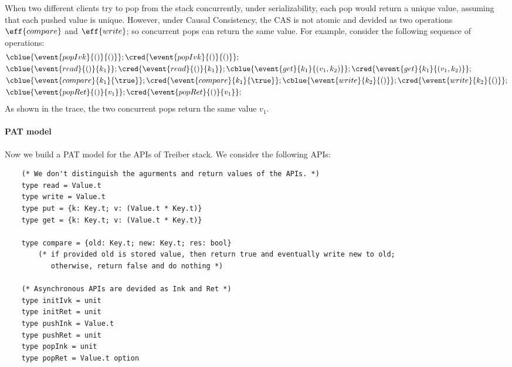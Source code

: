 When two different clients try to pop from the stack concurrently, under serializability, each pop
would return a unique value, assuming that each pushed value is unique. However, under Causal
Consistency, the CAS is not atomic and devided as two operations $\eff{compare}$ and $\eff{write}$; so concurrent pops can return the same value. For example, consider the following sequence of operations:
\begin{align*}
    &\cblue{\event{popIvk}{()}{()}};\cred{\event{popIvk}{()}{()}};\\
    &\cblue{\event{read}{()}{k_1}};\cred{\event{read}{()}{k_1}};\cblue{\event{get}{k_1}{(v_1, k_2)}};\cred{\event{get}{k_1}{(v_1, k_2)}};\\
    &\cblue{\event{compare}{k_1}{\true}};\cred{\event{compare}{k_1}{\true}};\cblue{\event{write}{k_2}{()}};\cred{\event{write}{k_2}{()}};\\
    &\cblue{\event{popRet}{()}{v_1}};\cred{\event{popRet}{()}{v_1}};
\end{align*}\noindent
As shown in the trace, the two concurrent pops return the same value $v_1$.

\paragraph{PAT model} Now we build a PAT model for the APIs of Treiber stack. We consider the following APIs:
\begin{verbatim}
    (* We don't distinguish the agurments and return values of the APIs. *)
    type read = Value.t
    type write = Value.t
    type put = {k: Key.t; v: (Value.t * Key.t)}
    type get = {k: Key.t; v: (Value.t * Key.t)}

    type compare = {old: Key.t; new: Key.t; res: bool} 
        (* if provided old is stored value, then return true and eventually write new to old; 
           otherwise, return false and do nothing *)

    (* Asynchronous APIs are devided as Ink and Ret *)
    type initIvk = unit
    type initRet = unit
    type pushInk = Value.t
    type pushRet = unit
    type popInk = unit
    type popRet = Value.t option
\end{verbatim}

